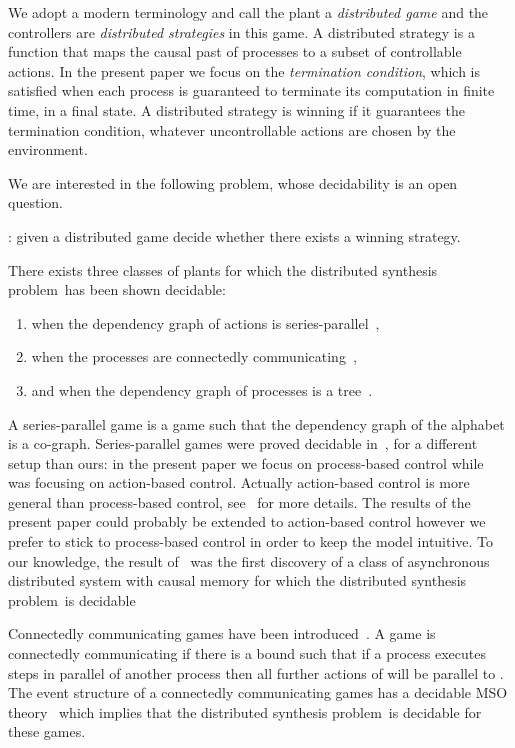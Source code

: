 \documentclass[a4paper,UKenglish]{lipics-v2016}
\begin{document}
\medskip

We adopt a modern terminology and call the plant a \emph{distributed game} and the controllers are \emph{distributed strategies} in this game.
A distributed strategy is a function that maps the causal past of processes
to a subset of controllable actions.
In the present paper we focus on the \emph{termination condition},
which is satisfied when each process is guaranteed to terminate its computation in finite time,  in a final state.
A distributed strategy is winning if it guarantees the termination condition,
whatever uncontrollable actions are chosen by the environment.


We are interested in the following problem, whose decidability is an open question.
\smallskip
\newcommand{\dsp}{{\sc distributed synthesis problem}}

\noindent \dsp: given a distributed game decide
whether  there exists a winning strategy.

\smallskip

There exists three classes of plants for which the \dsp\ 
has been shown decidable:
\begin{enumerate}
\item
when the dependency graph of actions is series-parallel~\cite{gastin}, 
\item
when the processes are connectedly communicating~\cite{madhu},
\item
 and when the dependency graph of processes is a tree~\cite{acyclic,DBLP:conf/fsttcs/MuschollW14}. 
\end{enumerate}

A series-parallel game is a game such that
the dependency graph  of the alphabet 
is a co-graph.
Series-parallel games were proved decidable in~\cite{gastin}, for a different setup than ours:
in the present paper we focus on process-based control while~\cite{gastin} was focusing
on action-based control. Actually action-based control is more general than process-based
control, see~\cite{alook} for more details. The results of the present paper could probably be extended to action-based control however we prefer to stick to process-based control in order to keep the model intuitive.
To our knowledge, the result of~\cite{gastin} was the first discovery of a class of asynchronous distributed system with causal memory for which the \dsp\ is decidable

Connectedly communicating games have been introduced~\cite{madhu}.
A game is connectedly communicating if there is a bound  such that if a process  executes  steps in parallel of another process  then all further actions of  will be parallel to .
The event structure of a 
connectedly communicating games has a decidable MSO theory~\cite{madhu}
which implies that the \dsp\ is decidable for these games.
\end{document}
